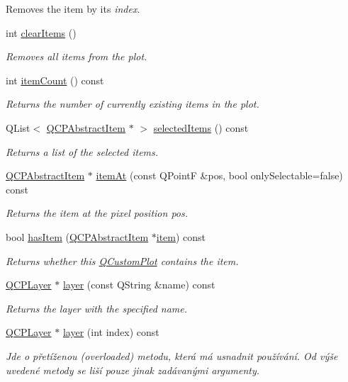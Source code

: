 \begin{DoxyCompactItemize}
\begin{DoxyCompactList}
Removes the item by its {\itshape index}. \end{DoxyCompactList}\item 
int \hyperlink{classQCustomPlot_abdfd07d4f0591d0cf967f85013fd3645}{clear\+Items} ()
\begin{DoxyCompactList}\small\item\em Removes all items from the plot. \end{DoxyCompactList}\item 
int \hyperlink{classQCustomPlot_a6fc860e30df17fd5c46056bf6fe29390}{item\+Count} () const 
\begin{DoxyCompactList}\small\item\em Returns the number of currently existing items in the plot. \end{DoxyCompactList}\item 
Q\+List$<$ \hyperlink{classQCPAbstractItem}{Q\+C\+P\+Abstract\+Item} $\ast$ $>$ \hyperlink{classQCustomPlot_a1a48b13547e2d9ac5cd6927516f47a2e}{selected\+Items} () const 
\begin{DoxyCompactList}\small\item\em Returns a list of the selected items. \end{DoxyCompactList}\item 
\hyperlink{classQCPAbstractItem}{Q\+C\+P\+Abstract\+Item} $\ast$ \hyperlink{classQCustomPlot_a793e4b04e0ede11a733021907368fa83}{item\+At} (const Q\+Point\+F \&pos, bool only\+Selectable=false) const 
\begin{DoxyCompactList}\small\item\em Returns the item at the pixel position {\itshape pos}. \end{DoxyCompactList}\item 
bool \hyperlink{classQCustomPlot_ab4199c38b03e63a2623c82453fe8add5}{has\+Item} (\hyperlink{classQCPAbstractItem}{Q\+C\+P\+Abstract\+Item} $\ast$\hyperlink{classQCustomPlot_a3e842b5a65b1d17fbb96cfb1fa1314d1}{item}) const 
\begin{DoxyCompactList}\small\item\em Returns whether this \hyperlink{classQCustomPlot}{Q\+Custom\+Plot} contains the {\itshape item}. \end{DoxyCompactList}\item 
\hyperlink{classQCPLayer}{Q\+C\+P\+Layer} $\ast$ \hyperlink{classQCustomPlot_aac492da01782820454e9136a8db28182}{layer} (const Q\+String \&name) const 
\begin{DoxyCompactList}\small\item\em Returns the layer with the specified {\itshape name}. \end{DoxyCompactList}\item 
\hyperlink{classQCPLayer}{Q\+C\+P\+Layer} $\ast$ \hyperlink{classQCustomPlot_a1e73051e371f1815b48d8b355be0d2ab}{layer} (int index) const 
\begin{DoxyCompactList}\small\item\em Jde o přetíženou (overloaded) metodu, která má usnadnit používání. Od výše uvedené metody se liší pouze jinak zadávanými argumenty.


\end{DoxyCompactList}
\end{DoxyCompactItemize}
